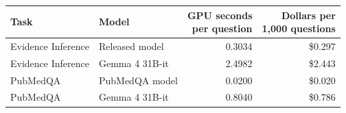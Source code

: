 \begin{tabular}{llrr}
\toprule
Task & Model & \shortstack{GPU seconds\\ per question} & \shortstack{Dollars per\\ 1,000 questions} \\
\midrule
Evidence Inference & Released model & 0.3034 & \$0.297 \\[2pt]
Evidence Inference & Gemma 4 31B-it & 2.4982 & \$2.443 \\[2pt]
PubMedQA & PubMedQA model & 0.0200 & \$0.020 \\[2pt]
PubMedQA & Gemma 4 31B-it & 0.8040 & \$0.786 \\[2pt]
\bottomrule
\end{tabular}
